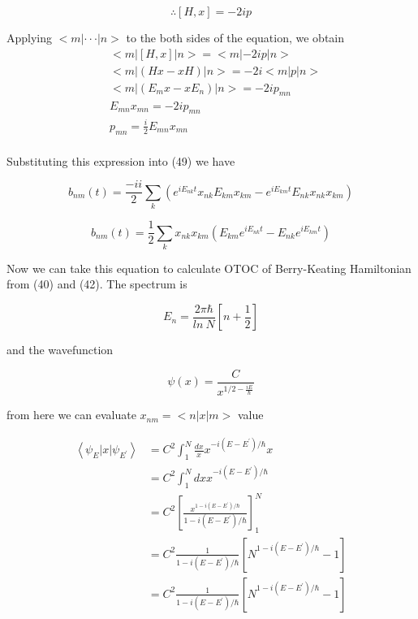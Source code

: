 \documentclass[12pt, letterpaper]{article}
\newcommand*{\1}{\hspace{1pt}}
\begin{document}
        \begin{equation}
            \therefore [H,x] = -2ip
        \end{equation}

        Applying $<m|\cdot \cdot \cdot|n>$ to the both sides of the equation, we obtain
        \begin{align*}
            &<m|[H,x]|n> = <m|-2ip|n> \\ 
            &<m|(Hx-xH)|n> = -2i<m|p|n> \\ 
            &<m|(E_{m}x-xE_{n})|n> = -2ip_{mn} \\ 
            &E_{mn}x_{mn} = -2ip_{mn} \\ 
            &p_{mn} = \frac{i}{2}E_{mn}x_{mn} \\  
        \end{align*}

        Substituting this expression into (49) we have 

        \begin{equation*}
            b_{nm}(t) = \frac{-i i}{2}\sum_{k} (e^{i E _{nk}t}x_{nk}E_{km}x_{km} - e^{iE_{km}t}E_{nk}x_{nk}x_{km}) 
        \end{equation*}
        
        \begin{equation}
            b_{nm}(t) = \frac{1}{2}\sum_{k} x_{nk}x_{km}(E_{km}e^{i E _{nk}t} - E_{nk}e^{iE_{km}t}) 
        \end{equation}
        
        Now we can take this equation to calculate OTOC of Berry-Keating Hamiltonian from (40) and (42). The spectrum is 

        \begin{equation}
            E_{n} = \frac{2\pi\hbar}{ln\ N}\left[n + \frac{1}{2}\right] 
        \end{equation}
        
        and the wavefunction 
        
        \begin{equation}
            \psi(x) = \frac{C}{x^{1/2 - \frac{iE}{\hbar}}}
        \end{equation}

        from here we can evaluate $x_{nm} = <n|x|m>$ value

        \begin{align*}
            \left\langle\psi_{E}| x |\psi_{E^{'}}\right\rangle &= C^{2} \int_{1}^{N} \frac{dx}{x} x^{-i(E-E^{'})/\hbar} x \\ 
            &= C^{2} \int_{1}^{N} dx x^{-i(E-E^{'})/\hbar} \\
            &= C^{2} \left[\frac{x^{1-i(E-E^{'})/\hbar}}{1-i(E-E^{'})/\hbar}\right]_{1}^{N} \\
            &= C^{2} \frac{1}{1-i(E-E^{'})/\hbar}\left[N^{1-i(E-E^{'})/\hbar} - 1\right] \\
            &= C^{2} \frac{1}{1-i(E-E^{'})/\hbar}\left[N^{1-i(E-E^{'})/\hbar} - 1\right] \\
        \end{align*}
\end{document}
